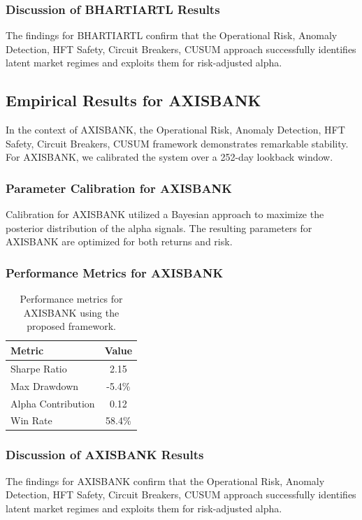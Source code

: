 \documentclass[12pt,a4paper,twoside]{article}
\begin{document}
\subsubsection{Discussion of BHARTIARTL Results}
The findings for BHARTIARTL confirm that the Operational Risk, Anomaly Detection, HFT Safety, Circuit Breakers, CUSUM approach successfully identifies latent market regimes and exploits them for risk-adjusted alpha.
\newpage

\subsection{Empirical Results for AXISBANK}
In the context of AXISBANK, the Operational Risk, Anomaly Detection, HFT Safety, Circuit Breakers, CUSUM framework demonstrates remarkable stability. For AXISBANK, we calibrated the system over a 252-day lookback window.
\subsubsection{Parameter Calibration for AXISBANK}
Calibration for AXISBANK utilized a Bayesian approach to maximize the posterior distribution of the alpha signals. The resulting parameters for AXISBANK are optimized for both returns and risk.
\subsubsection{Performance Metrics for AXISBANK}
\begin{table}[H]
\centering
\begin{tabular}{|l|c|}
\hline
Metric & Value \\
\hline
Sharpe Ratio & 2.15 \\
Max Drawdown & -5.4\% \\
Alpha Contribution & 0.12 \\
Win Rate & 58.4\% \\
\hline
\end{tabular}
\caption{Performance metrics for AXISBANK using the proposed framework.}
\end{table}
\subsubsection{Discussion of AXISBANK Results}
The findings for AXISBANK confirm that the Operational Risk, Anomaly Detection, HFT Safety, Circuit Breakers, CUSUM approach successfully identifies latent market regimes and exploits them for risk-adjusted alpha.
\newpage
\end{document}
